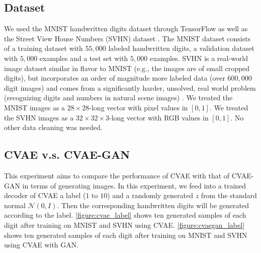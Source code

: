 \documentclass[10pt]{article}
\begin{document}
\subsection{Dataset}
We used the MNIST handwritten digits dataset \cite{lecun1998gradient} through TensorFlow as well as the Street View House Numbers (SVHN) dataset \cite{netzer2011reading}. The MNIST dataset consists of a training dataset with $55,000$ labeled handwritten digits, a validation dataset with $5,000$ examples and a test set with $5,000$ examples. SVHN is a real-world image dataset similar in flavor to MNIST (e.g., the images are of small cropped digits), but incorporates an order of magnitude more labeled data (over $600,000$ digit images) and comes from a significantly harder, unsolved, real world problem (recognizing digits and numbers in natural scene images) \cite{netzer2011reading}.
We treated the MNIST images as a $28\times 28$-long vector with pixel values in $[0,1]$. We treated the SVHN images as a $32 \times 32 \times 3$-long vector with RGB values in $[0,1]$. No other data cleaning was needed.


\subsection{CVAE v.s. CVAE-GAN}

This experiment aims to compare the performance of CVAE with that of CVAE-GAN in terms of generating images. In this experiment, we feed into a trained decoder of CVAE a label ($1$ to $10$) and a randomly generated $z$ from the standard normal $\mathcal{N}(0,I)$. Then the corresponding handwritten digits will be generated according to the label. \autoref{figure:cvae_label} shows ten generated samples of each digit after training on MNIST and SVHN using CVAE. \autoref{figure:cvaegan_label} shows ten generated samples of each digit after training on MNIST and SVHN using CVAE with GAN.
\end{document}
